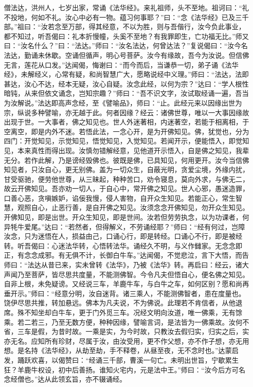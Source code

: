 \documentclass[12pt,twoside,openany]{book}
\begin{document}
僧法达，洪州人，七岁出家，常诵《法华经》。来礼祖师，头不至地。祖诃曰：“礼不投地，何如不礼。汝心中必有一物。蕴习何事耶？”曰：“念《法华经》已及三千部。”祖曰：“汝若念至万部，得其经意，不以为胜，则与吾偕行，汝今负此事业，都不知过，听吾偈曰：礼本折慢幢，头奚不至地？有我罪即生，亡功福无比。”师又曰：“汝名什么？”曰：“法达。”师曰：“汝名法达，何曾达法？”复说偈曰：“汝今名法达，勤诵未休歇。空诵但循声，明心号菩萨。汝今有缘故，吾今为汝说。但信佛无言，莲花从口发。”达闻偈，悔谢曰：“而今而后，当谦恭一切，弟子诵《法华经》，未解经义，心常有疑，和尚智慧广大，愿略说经中义理。”师曰：“法达，法即甚达，汝心不达，经本无疑，汝心自疑。汝念此经，以何为宗？”达曰：“学人根性暗钝，从来但依文诵念，岂知宗趣？”师曰：“吾不识文字，汝试取经诵一遍，吾当为汝解说。”法达即高声念经，至《譬喻品》，师曰：“止。此经元来以因缘出世为宗，纵说多种譬喻，亦无越于此。何者因缘？经云：诸佛世尊，唯以一大事因缘故出现于世。一大事者，佛之知见也。世人外迷著相，内迷著空，若能于相离相，于空离空，即是内外不迷。若悟此法，一念心开，是为开佛知见。佛，犹觉也，分为四门：开觉知见，示觉知见，悟觉知见，入觉知见。若闻开示，便能悟入，即觉知见，本来真性而得出现。汝慎勿错解经意，见他道开示悟入，自是佛之知见，我辈无分。若作此解，乃是谤经毁佛也。彼既是佛，已具知见，何用更开。汝今当信佛知见者，只汝自心，更无别佛。盖为一切众生，自蔽光明，贪爱尘境，外缘内扰，甘受驱驰，便劳他世尊，从三昧起，种种苦口，劝令寝息，莫向外求，与佛无二，故云开佛知见。吾亦劝一切人，于自心中，常开佛之知见。世人心邪，愚迷造罪，口善心恶，贪嗔嫉妒，谄佞我慢，侵人害物，自开众生知见。若能正心，常生智慧，观照自心，止恶行善，是自开佛之知见。汝须念念开佛知见，勿开众生知见。开佛知见，即是出世。开众生知见，即是世间。汝若但劳劳执念，以为功课者，何异牦牛爱尾。”达曰：“若然者，但得解义，不劳诵经耶？”师曰：“经有何过，岂障汝念，只为迷悟在人，损益由己，口诵心行，即是转经。口诵心不行，即是被经转。听吾偈曰：心迷法华转，心悟转法华。诵经久不明，与义作雠家。无念念即正，有念念成邪。有无俱不计，长御白牛车。”达闻偈，不觉悲泣，言下大悟，而告师曰：“法达从昔已来，实未曾转《法华》，乃被《法华》转。再启曰：经云，诸大声闻乃至菩萨，皆尽思共度量，不能测佛智。今令凡夫但悟自心，便名佛之知见。自非上根，未免疑谤。又经说三车，羊鹿牛车，与白牛之车，如何区别？愿和尚再垂开示。”师曰：“经意分明，汝自迷背。诸三乘人，不能测佛智者，患在度量也。饶伊尽思共推，转加悬远。佛本为凡夫说，不为佛说。此理若不肯信者，从他退席。殊不知坐却白牛车，更于门外觅三车。况经文明向汝道，唯一佛乘，无有馀乘。若二若三，乃至无数方便，种种因缘，譬喻言词，是法皆为一佛乘故。汝何不省，三车是假，为昔时故。一乘是实，为今时故，只教汝去假归实，归实之后，实亦无名。应知所有珍财，尽属于汝，由汝受用，更不作父想，亦不作子想，亦无用想。是名持《法华经》，从劫至劫，手不释卷，从昼至夜，无不念时也。”达蒙启发，踊跃欢喜，以偈赞曰：“经诵三千部，曹溪一句亡。未明出世旨，宁歇累生狂？羊鹿牛权设，初中后善扬。谁知火宅内，元是法中王。”师曰：“汝今后方可名念经僧也。”达从此领玄旨，亦不辍诵经。
\end{document}
